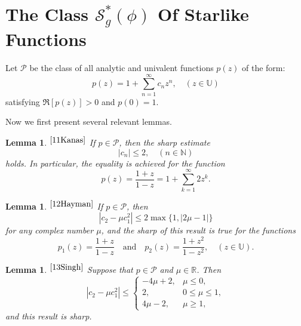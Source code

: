 \documentclass[11pt,twoside, reqno]{article}
\newtheorem{lemma}[theorem]{Lemma}
\theoremstyle{definition}
\begin{document}
\section{The Class $\mathcal{S}^{\ast }_{g}(\phi)$ Of Starlike Functions }

Let $\mathcal{P}$ be the class of all analytic and univalent functions $p(z)$ of the form:
\begin{equation}\label{e2.1}
p(z) = 1 + \sum_{n=1}^{\infty} c_n z^n, \quad (z \in \mathbb{U})
\end{equation}
satisfying $\Re[p(z)] > 0$ and $p(0) = 1$.

Now we first present several relevant lemmas.
\begin{lemma} $^{\cite{11Kanas}}$
If $p \in \mathcal{P}$, then the sharp estimate 
\begin{equation*}
\left|c_{n}\right| \leq 2, \quad (n \in \mathbb{N})
\end{equation*}
holds. In particular, the equality is achieved for the function
\begin{equation*}
p(z) = \frac{1+z}{1-z} = 1 + \sum_{k=1}^{\infty} 2 z^k.
\end{equation*}
\end{lemma}

\begin{lemma}$^{\cite{12Hayman}}$
If $p \in \mathcal{P}$, then 
\begin{equation*}
\left|c_{2} - \mu c_{1}^{2}\right| \leq 2 \max\{1, |2\mu - 1|\}
\end{equation*}
for any complex number $\mu$, and the sharp of this result is true for the functions
\begin{equation*}
p_1(z) = \frac{1+z}{1-z} \quad \text{and} \quad p_2(z) = \frac{1+z^2}{1-z^2}, \quad (z \in \mathbb{U}).
\end{equation*}
\end{lemma}

\begin{lemma}$^{\cite{13Singh}}$
Suppose that $p \in \mathcal{P}$ and $\mu \in \mathbb{R}$. Then
\begin{equation*}
\left|c_2 - \mu c_1^2\right| \leq
\begin{cases}
-4\mu + 2, & \mu \leq 0, \\
2, &  0 \leq \mu \leq 1, \\
4\mu - 2, &  \mu \geq 1,
\end{cases}
\end{equation*}
and this result is sharp.
\end{lemma}
\end{document}
